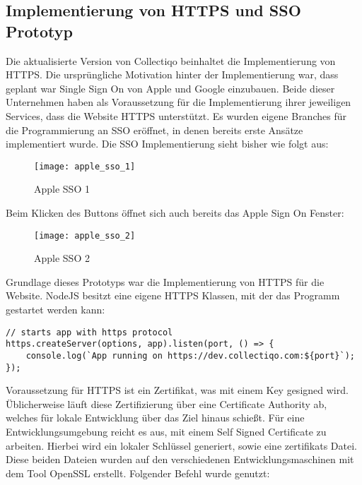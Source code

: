 \subsection{Implementierung von HTTPS und SSO Prototyp}\label{subsec:implementierung-von-https}

Die aktualisierte Version von Collectiqo beinhaltet die Implementierung von HTTPS.
Die ursprüngliche Motivation hinter der Implementierung war, dass geplant war Single Sign On von Apple und Google einzubauen.
Beide dieser Unternehmen haben als Voraussetzung für die Implementierung ihrer jeweiligen Services, dass die Website HTTPS unterstützt.
Es wurden eigene Branches für die Programmierung an SSO eröffnet, in denen bereits erste Ansätze implementiert wurde.
Die SSO Implementierung sieht bisher wie folgt aus:

\begin{figure}[h]
    \centering
    \texttt{[image: apple\_sso\_1]}
    \caption{Apple SSO 1}
    \label{fig:apple_sso_1}
\end{figure}

Beim Klicken des Buttons öffnet sich auch bereits das Apple Sign On Fenster:

\begin{figure}[h]
    \centering
    \texttt{[image: apple\_sso\_2]}
    \caption{Apple SSO 2}
    \label{fig:apple_sso_2}
\end{figure}

Grundlage dieses Prototyps war die Implementierung von HTTPS für die Website.
NodeJS besitzt eine eigene HTTPS Klassen, mit der das Programm gestartet werden kann:

\vspace{1em}
\lstset{language=JavaScript}
\begin{lstlisting}[label={lst:https}]
// starts app with https protocol
https.createServer(options, app).listen(port, () => {
    console.log(`App running on https://dev.collectiqo.com:${port}`);
});
\end{lstlisting}
\vspace{1em}

Voraussetzung für HTTPS ist ein Zertifikat, was mit einem Key gesigned wird.
Üblicherweise läuft diese Zertifizierung über eine Certificate Authority ab, welches für lokale Entwicklung über das Ziel hinaus schießt.
Für eine Entwicklungsumgebung reicht es aus, mit einem Self Signed Certificate zu arbeiten.
Hierbei wird ein lokaler Schlüssel generiert, sowie eine zertifikats Datei.
Diese beiden Dateien wurden auf den verschiedenen Entwicklungsmaschinen mit dem Tool OpenSSL erstellt.
Folgender Befehl wurde genutzt:

